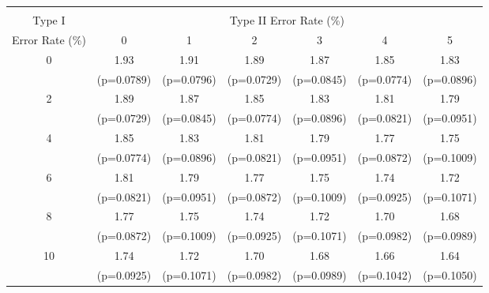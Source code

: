 \scriptsize{
\begin{tabular}{c|*{6}{c}}
\hline\hline \\[-8pt]
Type I & \multicolumn{6}{c}{Type II Error Rate (\%)} \\
Error Rate (\%)   & 0 & 1 & 2 & 3 & 4 & 5 \\ \hline
0 & 1.93 & 1.91 & 1.89 & 1.87 & 1.85 & 1.83 \\
 & (p=0.0789) & (p=0.0796) & (p=0.0729) & (p=0.0845) & (p=0.0774) & (p=0.0896) \\
[1em]
2 & 1.89 & 1.87 & 1.85 & 1.83 & 1.81 & 1.79 \\
 & (p=0.0729) & (p=0.0845) & (p=0.0774) & (p=0.0896) & (p=0.0821) & (p=0.0951) \\
[1em]
4 & 1.85 & 1.83 & 1.81 & 1.79 & 1.77 & 1.75 \\
 & (p=0.0774) & (p=0.0896) & (p=0.0821) & (p=0.0951) & (p=0.0872) & (p=0.1009) \\
[1em]
6 & 1.81 & 1.79 & 1.77 & 1.75 & 1.74 & 1.72 \\
 & (p=0.0821) & (p=0.0951) & (p=0.0872) & (p=0.1009) & (p=0.0925) & (p=0.1071) \\
[1em]
8 & 1.77 & 1.75 & 1.74 & 1.72 & 1.70 & 1.68 \\
 & (p=0.0872) & (p=0.1009) & (p=0.0925) & (p=0.1071) & (p=0.0982) & (p=0.0989) \\
[1em]
10 & 1.74 & 1.72 & 1.70 & 1.68 & 1.66 & 1.64 \\
 & (p=0.0925) & (p=0.1071) & (p=0.0982) & (p=0.0989) & (p=0.1042) & (p=0.1050) \\
\hline \hline
\end{tabular}
}